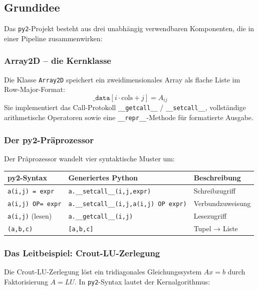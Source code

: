 \documentclass[a4paper,12pt]{article}
\theoremstyle{definition}
\begin{document}
\subsection{Grundidee}

Das \texttt{py2}-Projekt besteht aus drei unabh\"angig verwendbaren Komponenten,
die in einer Pipeline zusammenwirken:

\subsubsection{Array2D -- die Kernklasse}

Die Klasse \texttt{Array2D} speichert ein zweidimensionales Array als flache Liste
im Row-Major-Format:
\[
	\texttt{\_data}[i \cdot \text{cols} + j] = A_{ij}
\]
Sie implementiert das Call-Protokoll \texttt{\_\_getcall\_\_} / \texttt{\_\_setcall\_\_},
vollst\"andige arithmetische Operatoren sowie eine \texttt{\_\_repr\_\_}-Methode
f\"ur formatierte Ausgabe.

\subsubsection{Der py2-Pr\"aprozessor}

Der Pr\"aprozessor wandelt vier syntaktische Muster um:

\begin{center}
\begin{tabular}{lll}
\toprule
\textbf{py2-Syntax} & \textbf{Generiertes Python} & \textbf{Beschreibung} \\
\midrule
\texttt{a(i,j) = expr} & \texttt{a.\_\_setcall\_\_(i,j,expr)} & Schreibzugriff \\
\texttt{a(i,j) OP= expr} & \texttt{a.\_\_setcall\_\_(i,j,a(i,j) OP expr)} & Verbundzuweisung \\
\texttt{a(i,j)} (lesen) & \texttt{a.\_\_getcall\_\_(i,j)} & Lesezugriff \\
\texttt{(a,b,c)} & \texttt{[a,b,c]} & Tupel → Liste \\
\bottomrule
\end{tabular}
\end{center}

\subsubsection{Das Leitbeispiel: Crout-LU-Zerlegung}

Die Crout-LU-Zerlegung l\"ost ein tridiagonales Gleichungssystem $Ax = b$ durch
Faktorisierung $A = LU$. In \texttt{py2}-Syntax lautet der Kernalgorithmus:
\end{document}
